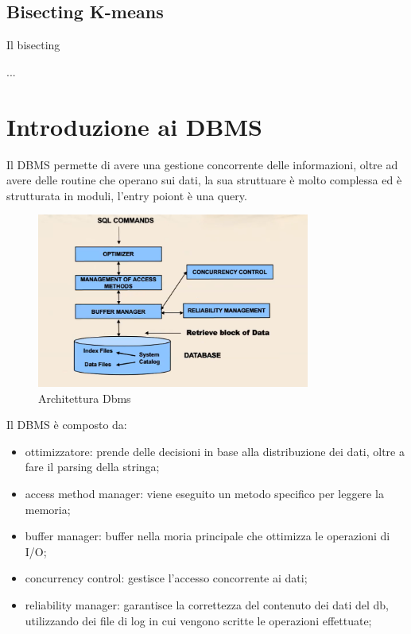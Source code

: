 \documentclass[12pt]{article}
\begin{document}
\subsection{Bisecting K-means}
Il bisecting

...




\section{Introduzione ai DBMS}
Il DBMS permette di avere una gestione concorrente delle informazioni, oltre ad avere delle routine che operano sui dati, la sua struttuare \`e molto complessa ed \`e strutturata in moduli, l'entry poiont \`e una query.
\begin{figure}[H]
    \centering
    \includegraphics[width=0.8\textwidth]{architettura-dbms.png}
    \caption{Architettura Dbms}
    \label{fig:architettura-dbms}
\end{figure}
Il DBMS \`e composto da:
\begin{itemize}
    \item ottimizzatore: prende delle decisioni in base alla distribuzione dei dati, oltre a fare il parsing della stringa;
    \item access method manager: viene eseguito un metodo specifico per leggere la memoria;
    \item buffer manager: buffer nella moria principale che ottimizza le operazioni di I/O;
    \item concurrency control: gestisce l'accesso concorrente ai dati;
    \item reliability manager: garantisce la correttezza del contenuto dei dati del db, utilizzando dei file di log in cui vengono scritte le operazioni effettuate;
\end{itemize}
\end{document}
